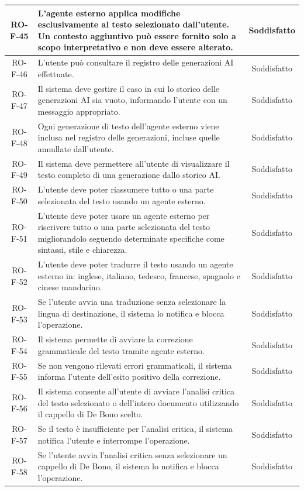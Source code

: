 \documentclass[11pt,a4paper]{article}
\begin{document}
\begin{longtable}{|c|p{11cm}|c|}
\hline
RO-F-45 & L'agente esterno applica modifiche esclusivamente al testo selezionato dall'utente. Un contesto aggiuntivo può essere fornito solo a scopo interpretativo e non deve essere alterato. & Soddisfatto \\
\hline
RO-F-46 & L'utente può consultare il registro delle generazioni AI effettuate. & Soddisfatto \\
\hline
RO-F-47 & Il sistema deve gestire il caso in cui lo storico delle generazioni AI sia vuoto, informando l'utente con un messaggio appropriato. & Soddisfatto \\
\hline
RO-F-48 & Ogni generazione di testo dell'agente esterno viene inclusa nel registro delle generazioni, incluse quelle annullate dall'utente. & Soddisfatto \\
\hline
RO-F-49 & Il sistema deve permettere all'utente di visualizzare il testo completo di una generazione dallo storico AI. & Soddisfatto \\
\hline
RO-F-50 & L'utente deve poter riassumere tutto o una parte selezionata del testo usando un agente esterno. & Soddisfatto \\
\hline
RO-F-51 & L'utente deve poter usare un agente esterno per riscrivere tutto o una parte selezionata del testo migliorandolo seguendo determinate specifiche come sintassi, stile e chiarezza. & Soddisfatto \\
\hline
RO-F-52 & L'utente deve poter tradurre il testo usando un agente esterno in: inglese, italiano, tedesco, francese, spagnolo e cinese mandarino. & Soddisfatto \\
\hline
RO-F-53 & Se l'utente avvia una traduzione senza selezionare la lingua di destinazione, il sistema lo notifica e blocca l'operazione. & Soddisfatto \\
\hline
RO-F-54 & Il sistema permette di avviare la correzione grammaticale del testo tramite agente esterno. & Soddisfatto \\
\hline
RO-F-55 & Se non vengono rilevati errori grammaticali, il sistema informa l'utente dell'esito positivo della correzione. & Soddisfatto \\
\hline
RO-F-56 & Il sistema consente all'utente di avviare l'analisi critica del testo selezionato o dell'intero documento utilizzando il cappello di De Bono scelto. & Soddisfatto \\
\hline
RO-F-57 & Se il testo è insufficiente per l'analisi critica, il sistema notifica l'utente e interrompe l'operazione. & Soddisfatto \\
\hline
RO-F-58 & Se l'utente avvia l'analisi critica senza selezionare un cappello di De Bono, il sistema lo notifica e blocca l'operazione. & Soddisfatto \\

\end{longtable}
\end{document}
